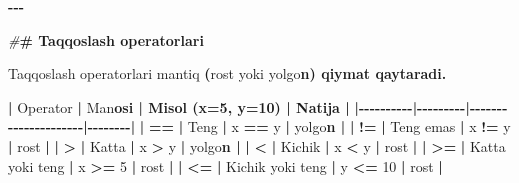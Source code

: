 \documentclass[a4paper,11pt,twoside,openright]{book}
\newenvironment{Shaded}{\begin{snugshade}}{\end{snugshade}}
\newcommand{\CharTok}[1]{\textcolor[rgb]{0.31,0.60,0.02}{#1}}
\newcommand{\DecValTok}[1]{\textcolor[rgb]{0.00,0.00,0.81}{#1}}
\newcommand{\ErrorTok}[1]{\textcolor[rgb]{0.64,0.00,0.00}{\textbf{#1}}}
\newcommand{\NormalTok}[1]{#1}
\newcommand{\OperatorTok}[1]{\textcolor[rgb]{0.81,0.36,0.00}{\textbf{#1}}}
\newcommand{\PreprocessorTok}[1]{\textcolor[rgb]{0.56,0.35,0.01}{\textit{#1}}}
\begin{document}
\begin{Shaded}
\begin{Highlighting}[]
\OperatorTok{{-}{-}{-}}

\PreprocessorTok{\#}\ErrorTok{\# Taqqoslash operatorlari}

\NormalTok{Taqqoslash operatorlari }\ErrorTok{\textasciigrave{}}\NormalTok{mantiq}\ErrorTok{\textasciigrave{}} \OperatorTok{(}\ErrorTok{\textasciigrave{}}\NormalTok{rost}\ErrorTok{\textasciigrave{}}\NormalTok{ yoki }\ErrorTok{\textasciigrave{}}\NormalTok{yolg}\CharTok{\textquotesingle{}o}\ErrorTok{n\textasciigrave{}) qiymat qaytaradi.}

\OperatorTok{|}\NormalTok{ Operator }\OperatorTok{|}\NormalTok{ Ma}\CharTok{\textquotesingle{}n}\ErrorTok{osi | Misol (\textasciigrave{}x=5, y=10\textasciigrave{}) | Natija |}
\OperatorTok{|{-}{-}{-}{-}{-}{-}{-}{-}{-}{-}|{-}{-}{-}{-}{-}{-}{-}{-}{-}|{-}{-}{-}{-}{-}{-}{-}{-}{-}{-}{-}{-}{-}{-}{-}{-}{-}{-}{-}{-}{-}|{-}{-}{-}{-}{-}{-}{-}{-}|}
\OperatorTok{|} \ErrorTok{\textasciigrave{}}\OperatorTok{==}\ErrorTok{\textasciigrave{}} \OperatorTok{|}\NormalTok{ Teng }\OperatorTok{|} \ErrorTok{\textasciigrave{}}\NormalTok{x }\OperatorTok{==}\NormalTok{ y}\ErrorTok{\textasciigrave{}} \OperatorTok{|} \ErrorTok{\textasciigrave{}}\NormalTok{yolg}\CharTok{\textquotesingle{}o}\ErrorTok{n\textasciigrave{} |}
\OperatorTok{|} \ErrorTok{\textasciigrave{}}\OperatorTok{!=}\ErrorTok{\textasciigrave{}} \OperatorTok{|}\NormalTok{ Teng emas }\OperatorTok{|} \ErrorTok{\textasciigrave{}}\NormalTok{x }\OperatorTok{!=}\NormalTok{ y}\ErrorTok{\textasciigrave{}} \OperatorTok{|} \ErrorTok{\textasciigrave{}}\NormalTok{rost}\ErrorTok{\textasciigrave{}} \OperatorTok{|}
\OperatorTok{|} \ErrorTok{\textasciigrave{}}\OperatorTok{\textgreater{}}\ErrorTok{\textasciigrave{}} \OperatorTok{|}\NormalTok{ Katta }\OperatorTok{|} \ErrorTok{\textasciigrave{}}\NormalTok{x }\OperatorTok{\textgreater{}}\NormalTok{ y}\ErrorTok{\textasciigrave{}} \OperatorTok{|} \ErrorTok{\textasciigrave{}}\NormalTok{yolg}\CharTok{\textquotesingle{}o}\ErrorTok{n\textasciigrave{} |}
\OperatorTok{|} \ErrorTok{\textasciigrave{}}\OperatorTok{\textless{}}\ErrorTok{\textasciigrave{}} \OperatorTok{|}\NormalTok{ Kichik }\OperatorTok{|} \ErrorTok{\textasciigrave{}}\NormalTok{x }\OperatorTok{\textless{}}\NormalTok{ y}\ErrorTok{\textasciigrave{}} \OperatorTok{|} \ErrorTok{\textasciigrave{}}\NormalTok{rost}\ErrorTok{\textasciigrave{}} \OperatorTok{|}
\OperatorTok{|} \ErrorTok{\textasciigrave{}}\OperatorTok{\textgreater{}=}\ErrorTok{\textasciigrave{}} \OperatorTok{|}\NormalTok{ Katta yoki teng }\OperatorTok{|} \ErrorTok{\textasciigrave{}}\NormalTok{x }\OperatorTok{\textgreater{}=} \DecValTok{5}\ErrorTok{\textasciigrave{}} \OperatorTok{|} \ErrorTok{\textasciigrave{}}\NormalTok{rost}\ErrorTok{\textasciigrave{}} \OperatorTok{|}
\OperatorTok{|} \ErrorTok{\textasciigrave{}}\OperatorTok{\textless{}=}\ErrorTok{\textasciigrave{}} \OperatorTok{|}\NormalTok{ Kichik yoki teng }\OperatorTok{|} \ErrorTok{\textasciigrave{}}\NormalTok{y }\OperatorTok{\textless{}=} \DecValTok{10}\ErrorTok{\textasciigrave{}} \OperatorTok{|} \ErrorTok{\textasciigrave{}}\NormalTok{rost}\ErrorTok{\textasciigrave{}} \OperatorTok{|}


\end{Highlighting}
\end{Shaded}
\end{document}
